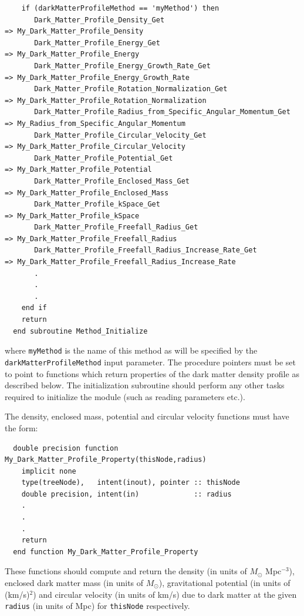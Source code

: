 \begin{verbatim}
    if (darkMatterProfileMethod == 'myMethod') then
       Dark_Matter_Profile_Density_Get                               => My_Dark_Matter_Profile_Density
       Dark_Matter_Profile_Energy_Get                                => My_Dark_Matter_Profile_Energy
       Dark_Matter_Profile_Energy_Growth_Rate_Get                    => My_Dark_Matter_Profile_Energy_Growth_Rate
       Dark_Matter_Profile_Rotation_Normalization_Get                => My_Dark_Matter_Profile_Rotation_Normalization
       Dark_Matter_Profile_Radius_from_Specific_Angular_Momentum_Get => My_Radius_from_Specific_Angular_Momentum
       Dark_Matter_Profile_Circular_Velocity_Get                     => My_Dark_Matter_Profile_Circular_Velocity
       Dark_Matter_Profile_Potential_Get                             => My_Dark_Matter_Profile_Potential
       Dark_Matter_Profile_Enclosed_Mass_Get                         => My_Dark_Matter_Profile_Enclosed_Mass
       Dark_Matter_Profile_kSpace_Get                                => My_Dark_Matter_Profile_kSpace
       Dark_Matter_Profile_Freefall_Radius_Get                       => My_Dark_Matter_Profile_Freefall_Radius
       Dark_Matter_Profile_Freefall_Radius_Increase_Rate_Get         => My_Dark_Matter_Profile_Freefall_Radius_Increase_Rate
       .
       .
       .
    end if
    return
  end subroutine Method_Initialize
\end{verbatim}
where {\tt myMethod} is the name of this method as will be specified by the {\tt darkMatterProfileMethod} input parameter. The procedure pointers must be set to point to functions which return properties of the dark matter density profile as described below. The initialization subroutine should perform any other tasks required to initialize the module (such as reading parameters etc.).

The density, enclosed mass, potential and circular velocity functions must have the form:
\begin{verbatim}
  double precision function My_Dark_Matter_Profile_Property(thisNode,radius)
    implicit none
    type(treeNode),   intent(inout), pointer :: thisNode
    double precision, intent(in)             :: radius
    .
    .
    .
    return
  end function My_Dark_Matter_Profile_Property
\end{verbatim}
These functions should compute and return the density (in units of $M_\odot$ Mpc$^{-3}$), enclosed dark matter mass (in units of $M_\odot$), gravitational potential (in units of (km/s)$^2$) and circular velocity (in units of km/s) due to dark matter at the given {\tt radius} (in units of Mpc) for {\tt thisNode} respectively.

